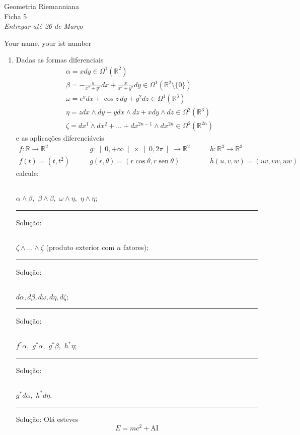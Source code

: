 \documentclass[a4paper,11pt]{article}
\newcommand{\bbR}{\mathbb{R}}
\newcommand{\sen}{\operatorname{sen}}
\newcommand{\solution}{\par\noindent\rule{\textwidth}{0.4pt} Solu\c{c}\~ao:}
\begin{document}
\pagestyle{empty}

\renewcommand{\arraystretch}{1.5}

\begin{center}
{\huge Geometria Riemanniana}\\
\vspace{1cm}
{\Large Ficha 5}\\
\vspace{.5cm}
{\em Entregar at\'e 26 de Mar\c{c}o}
\vspace{.5cm}

Your name, your ist number

\end{center}

\bigskip
\bigskip

\begin{enumerate}

\item
Dadas as formas diferenciais
\begin{align*}
& \alpha = xdy \in \Omega^1(\bbR^2)\\
& \beta = -\frac{y}{x^2+y^2}dx+\frac{x}{x^2+y^2}dy \in \Omega^1(\bbR^2 \setminus \{ 0 \})\\
& \omega = e^{y} dx + \cos z \, dy + y^2 dz \in \Omega^1(\bbR^3)\\
& \eta = z dx \wedge dy - y dx \wedge dz + x dy \wedge dz \in \Omega^2(\bbR^3)\\
& \zeta = dx^1 \wedge dx^2 + \ldots + dx^{2n-1} \wedge dx^{2n} \in \Omega^2(\bbR^{2n})
\end{align*}
e as aplica\c{c}\~oes diferenci\'aveis
\begin{eqnarray*}
f:\bbR \to \bbR^2 \qquad & g:\left]0,+\infty\right[ \times \left]0,2\pi\right[ \to \bbR^2 \qquad & h: \bbR^3 \to \bbR^3 \\
f(t)=(t,t^2) \qquad & g(r,\theta)=(r\cos \theta, r \sen \theta) \qquad & h(u,v,w)=(uv,vw,uw)
\end{eqnarray*}
calcule:
\subsection{}
$\alpha \wedge \beta, \,\, \beta \wedge \beta, \,\, \omega \wedge \eta, \,\, \eta \wedge \eta$;
\solution
\subsection{}
$\zeta \wedge \ldots \wedge \zeta$ (produto exterior com $n$ fatores);
\solution
\subsection{}
$d\alpha, d\beta, d\omega, d\eta, d\zeta$;
\solution
\subsection{}
$f^* \alpha, \,\, g^* \alpha, \,\, g^* \beta, \,\, h^* \eta$;
\solution
\subsection{}
$g^* d\alpha, \,\, h^* d\eta$.
\solution
Olá esteves
\begin{equation*}
    E=mc^2+\text{AI}
\end{equation*}

\end{enumerate}
\end{document}
